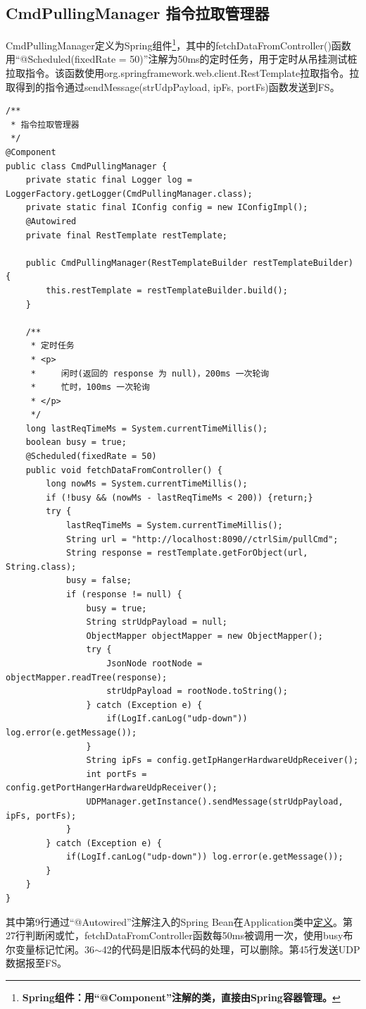 \subsection{CmdPullingManager 指令拉取管理器}
CmdPullingManager定义为Spring组件\footnote{\bf{Spring组件}：用“@Component”注解的类，直接由Spring容器管理。}，其中的fetchDataFromController()函数用“@Scheduled(fixedRate = 50)”注解为50ms的定时任务，用于定时从吊挂测试桩拉取指令。该函数使用org.springframework.web.client.RestTemplate拉取指令。拉取得到的指令通过sendMessage(strUdpPayload, ipFs, portFs)函数发送到FS。
\begin{lstlisting}
/**
 * 指令拉取管理器
 */
@Component
public class CmdPullingManager {
    private static final Logger log = LoggerFactory.getLogger(CmdPullingManager.class);
    private static final IConfig config = new IConfigImpl();
    @Autowired
    private final RestTemplate restTemplate;

    public CmdPullingManager(RestTemplateBuilder restTemplateBuilder) {
        this.restTemplate = restTemplateBuilder.build();
    }

    /**
     * 定时任务
     * <p>
     *     闲时(返回的 response 为 null)，200ms 一次轮询
     *     忙时，100ms 一次轮询
     * </p>
     */
    long lastReqTimeMs = System.currentTimeMillis();
    boolean busy = true;
    @Scheduled(fixedRate = 50)
    public void fetchDataFromController() {
        long nowMs = System.currentTimeMillis();
        if (!busy && (nowMs - lastReqTimeMs < 200)) {return;}
        try {
            lastReqTimeMs = System.currentTimeMillis();
            String url = "http://localhost:8090//ctrlSim/pullCmd";
            String response = restTemplate.getForObject(url, String.class);
            busy = false;
            if (response != null) {
                busy = true;
                String strUdpPayload = null;
                ObjectMapper objectMapper = new ObjectMapper();
                try {
                    JsonNode rootNode = objectMapper.readTree(response);
                    strUdpPayload = rootNode.toString();
                } catch (Exception e) {
                    if(LogIf.canLog("udp-down")) log.error(e.getMessage());
                }
                String ipFs = config.getIpHangerHardwareUdpReceiver();
                int portFs = config.getPortHangerHardwareUdpReceiver();
                UDPManager.getInstance().sendMessage(strUdpPayload, ipFs, portFs);
            }
        } catch (Exception e) {
            if(LogIf.canLog("udp-down")) log.error(e.getMessage());
        }
    }
}
\end{lstlisting}\vspace{-30pt}
其中第9行通过“@Autowired”注解注入的Spring Bean在Application类中\hyperref[code:simapp]{\underline{定义}}。第27行判断闲或忙，fetchDataFromController函数每50ms被调用一次，使用busy布尔变量标记忙闲。36$\sim$42的代码是旧版本代码的处理，可以删除。第45行发送UDP数据报至FS。
